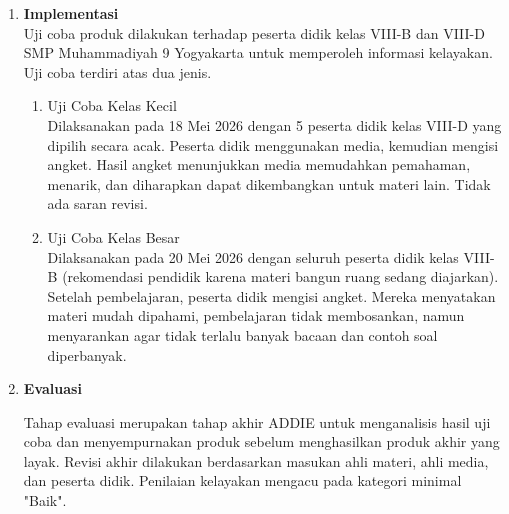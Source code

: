 \begin{enumerate}[leftmargin=1cm, label=\arabic*.]
\begin{enumerate}[label=\arabic*)]
        \textbf{Validasi Ahli Media:}
        
        \hspace*{1cm}Ahli media terdiri atas:
        \begin{enumerate}[leftmargin=*, label=--]
            \item Bapak Anggit Prabowo, M.Pd., dosen Pendidikan Matematika UAD.
            \item Bapak Wibowo Ramadhiyanto, S.Pd., pendidik Matematika SMP Muhammadiyah 9 Yogyakarta.
        \end{enumerate}
        
        \hspace*{1cm}Tidak ada revisi signifikan; hanya kunci jawaban yang salah telah diperbaiki. Bapak Wibowo menyatakan bahwa media memiliki visual baik dan ilustrasi yang mempermudah pemahaman.
    \end{enumerate}

    \item \textbf{Implementasi}\\
    \hspace*{1cm}Uji coba produk dilakukan terhadap peserta didik kelas VIII-B dan VIII-D SMP Muhammadiyah 9 Yogyakarta untuk memperoleh informasi kelayakan. Uji coba terdiri atas dua jenis.
    \begin{enumerate}
        \item Uji Coba Kelas Kecil \\
        \hspace*{1cm}Dilaksanakan pada 18 Mei 2026 dengan 5 peserta didik kelas VIII-D yang dipilih secara acak. Peserta didik menggunakan media, kemudian mengisi angket. Hasil angket menunjukkan media memudahkan pemahaman, menarik, dan diharapkan dapat dikembangkan untuk materi lain. Tidak ada saran revisi.

        \item Uji Coba Kelas Besar \\
        \hspace*{1cm}Dilaksanakan pada 20 Mei 2026 dengan seluruh peserta didik kelas VIII-B (rekomendasi pendidik karena materi bangun ruang sedang diajarkan). Setelah pembelajaran, peserta didik mengisi angket. Mereka menyatakan materi mudah dipahami, pembelajaran tidak membosankan, namun menyarankan agar tidak terlalu banyak bacaan dan contoh soal diperbanyak.
    \end{enumerate}

    \item \textbf{Evaluasi}
    
    \hspace{1cm}Tahap evaluasi merupakan tahap akhir ADDIE untuk menganalisis hasil uji coba dan menyempurnakan produk sebelum menghasilkan produk akhir yang layak. Revisi akhir dilakukan berdasarkan masukan ahli materi, ahli media, dan peserta didik. Penilaian kelayakan mengacu pada kategori minimal "Baik".

\end{enumerate}

